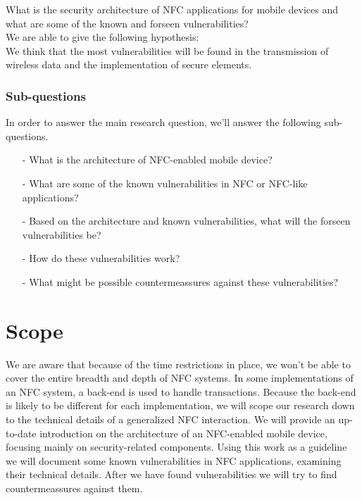 \documentclass[11pt]{article} %
\begin{document}
\noindent What is the security architecture of NFC applications for mobile devices and what are some of the known and forseen vulnerabilities? %
\\

\noindent We are able to give the following hypothesis:
\\

\noindent We think that the most vulnerabilities will be found in the transmission of wireless data and the implementation of secure elements. %

\subsubsection{Sub-questions}

In order to answer the main research question, we'll answer the following sub-questions.

\begin{itemize}
\item [-] What is the architecture of NFC-enabled mobile device?

\item [-] What are some of the known vulnerabilities in NFC or NFC-like applications?

\item [-] Based on the architecture and known vulnerabilities, what will the forseen vulnerabilities be?

\item [-] How do these vulnerabilities work?

\item [-] What might be possible countermeassures against these vulnerabilities?

\end{itemize}

\section{Scope}
We are aware that because of the time restrictions in place, we won't be able to cover the entire breadth and depth of NFC systems.
In some implementations of an NFC system, a back-end is used to handle transactions.
Because the back-end is likely to be different for each implementation, we will scope our research down to the technical details of a generalized NFC interaction.
We will provide an up-to-date introduction on the architecture of an NFC-enabled mobile device, focusing mainly on security-related components.
Using this work as a guideline we will document some known vulnerabilities in NFC applications, examining their technical details.
After we have found vulnerabilities we will try to find countermeassures against them. 
\end{document}
